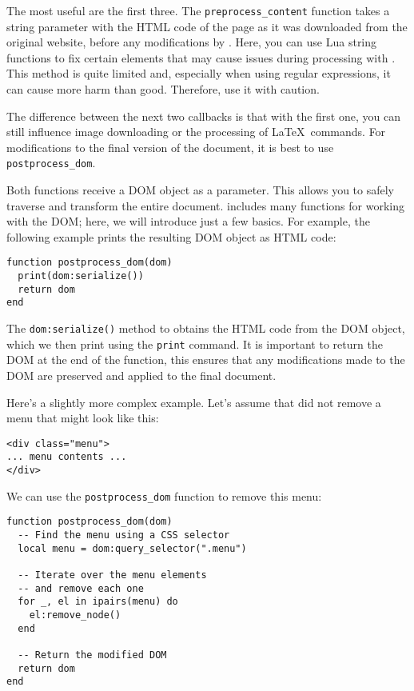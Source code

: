 \documentclass{ltugboat}
\begin{document}
The most useful are the first three. The \texttt{preprocess\_content} function
takes a string parameter with the HTML code of the page as it was downloaded
from the original website, before any modifications by . Here,
you can use Lua string functions to fix certain elements that may cause issues
during processing with . This method is quite limited and,
especially when using regular expressions, it can cause more harm than good.
Therefore, use it with caution.

The difference between the next two callbacks is that with the first one, you
can still influence image downloading or the processing of \LaTeX\ commands. For
modifications to the final version of the document, it is best to use
\texttt{postprocess\_dom}.

Both functions receive a  DOM object as a parameter. This
allows you to safely traverse and transform the entire document.
 includes many functions for working with the DOM; here, we
will introduce just a few basics. For example, the following example prints the
resulting DOM object as HTML code:

\begin{verbatim}
function postprocess_dom(dom)
  print(dom:serialize())
  return dom
end
\end{verbatim}

The \texttt{dom:serialize()} method to obtains the HTML
code from the DOM object, which we then print using the \texttt{print} command.
It is important to return the DOM at the end of the function, this ensures that
any modifications made to the DOM are preserved and applied to the final
document.



Here's a slightly more complex example. Let's assume that  did
not remove a menu that might look like this:

\begin{verbatim}
<div class="menu">
... menu contents ...
</div>
\end{verbatim}

We can use the \texttt{postprocess\_dom} function to remove this menu:

\begin{verbatim}
function postprocess_dom(dom)
  -- Find the menu using a CSS selector
  local menu = dom:query_selector(".menu")

  -- Iterate over the menu elements 
  -- and remove each one
  for _, el in ipairs(menu) do
    el:remove_node()
  end
  
  -- Return the modified DOM
  return dom
end
\end{verbatim}
\end{document}
